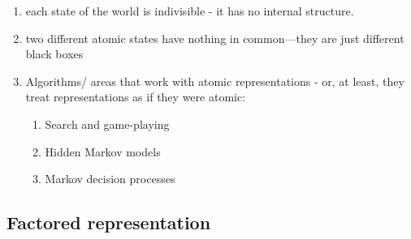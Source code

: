 \begin{enumerate}[itemsep=0.2cm]
    \item each state of the world is indivisible - it has no internal structure. 
    \hfill \cite{ai/book/Artificial-Intelligence-A-Modern-Approach/Russell-Norvig}

    \item two different atomic states have nothing in common—they are just different black boxes
    \hfill \cite{ai/book/Artificial-Intelligence-A-Modern-Approach/Russell-Norvig}

    \item Algorithms/ areas that work with atomic representations - or, at least, they treat representations as if they were atomic:
    \begin{enumerate}
        \item Search and game-playing
        \hfill \cite{ai/book/Artificial-Intelligence-A-Modern-Approach/Russell-Norvig}

        \item Hidden Markov models
        \hfill \cite{ai/book/Artificial-Intelligence-A-Modern-Approach/Russell-Norvig}

        \item Markov decision processes
        \hfill \cite{ai/book/Artificial-Intelligence-A-Modern-Approach/Russell-Norvig}
    \end{enumerate}
\end{enumerate}



\subsection{Factored representation}


